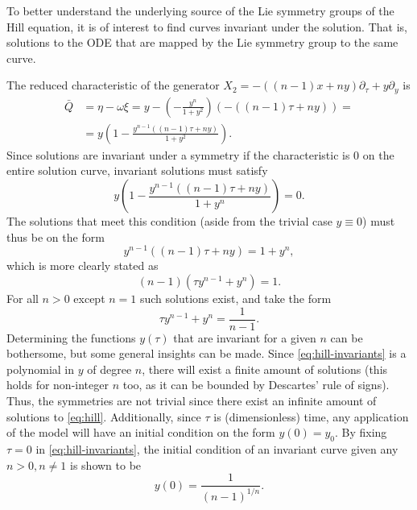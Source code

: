 To better understand the underlying source of the Lie symmetry groups of the Hill equation, it is of interest to find curves invariant under the solution.
That is, solutions to the ODE that are mapped by the Lie symmetry group to the same curve.

The reduced characteristic of the generator \(X_2 = - \left( (n-1) x + n y \right) \partial_\tau + y \partial_y\) is
\begin{align}
  \bar{Q} &= 
  \eta - \omega \xi = 
  y - \left( -\frac{y^n}{1+y^2} \right) \left( - \left( (n-1) \tau + n y \right) \right) =\\
  &= y \left(1 -\frac{y^{n-1} \left( (n-1) \tau + n y \right)}{1+y^2} \right).
\end{align}
Since solutions are invariant under a symmetry if the characteristic is 0 on the entire solution curve, invariant solutions must satisfy
\begin{equation}
  y \left(1 -\frac{y^{n-1} \left( (n-1) \tau + n y \right)}{1+y^n} \right) = 0.
\end{equation}
The solutions that meet this condition (aside from the trivial case \(y \equiv 0\)) must thus be on the form
\begin{equation}
  y^{n-1} \left( (n-1) \tau + n y \right) = 1+y^n,
\end{equation}
which is more clearly stated as
\begin{equation}
  (n-1) \left( \tau y^{n-1} + y^n \right) = 1.
\end{equation}
For all \(n>0\) except \(n=1\) such solutions exist, and take the form
\begin{equation} \label{eq:hill-invariants}
  \tau y^{n-1} + y^n = \frac{1}{n-1}.
\end{equation}
Determining the functions \(y(\tau)\) that are invariant for a given \(n\) can be bothersome, but some general insights can be made.
Since \cref{eq:hill-invariants} is a polynomial in \(y\) of degree \(n\), there will exist a finite amount of solutions (this holds for non-integer \(n\) too, as it can be bounded by Descartes' rule of signs). %
Thus, the symmetries are not trivial since there exist an infinite amount of solutions to \cref{eq:hill}.
Additionally, since \(\tau\) is (dimensionless) time, any application of the model will have an initial condition on the form \(y(0) = y_0\).
By fixing \(\tau=0\) in \cref{eq:hill-invariants}, the initial condition of an invariant curve given any \(n>0, n\neq1\) is shown to be
\begin{equation}
  y(0) =\frac{1}{(n-1)^{1/n}}.
\end{equation}
